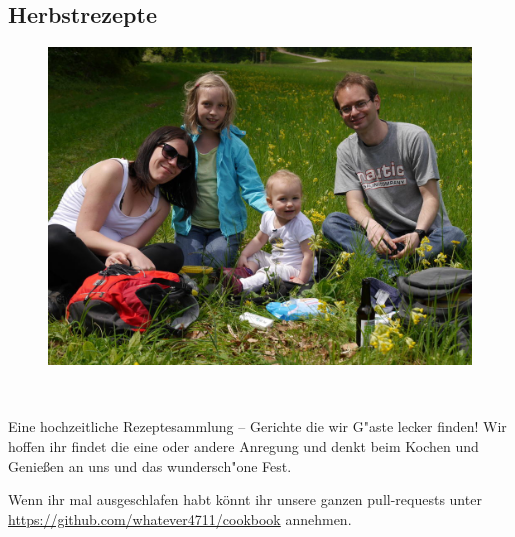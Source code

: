 \documentclass[%
a4paper,
twoside,
12pt
]{article}
\begin{document}
\begin{otherlanguage}{ngerman}
\subsection{Herbstrezepte}
\begin{figure}[h]
	\includegraphics[width=\textwidth]{pic/US}
\end{figure}












\end{otherlanguage}

\clearpage
~\thispagestyle{empty}
\clearpage
\thispagestyle{empty}
~
\vfill
\begin{center}
\end{center}


    Eine hochzeitliche Rezeptesammlung -- Gerichte die wir G"aste lecker finden! Wir hoffen ihr findet die eine oder andere Anregung und denkt beim Kochen und Genießen an uns und das wundersch"one Fest.
    
    Wenn ihr mal ausgeschlafen habt könnt ihr unsere ganzen pull-requests unter \url{https://github.com/whatever4711/cookbook} annehmen.
\end{document}
